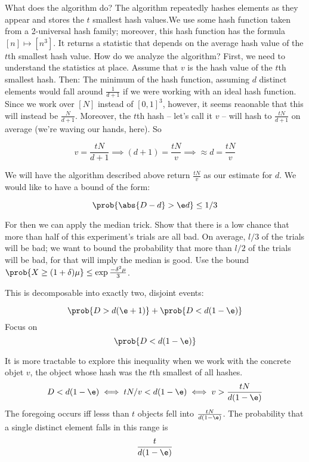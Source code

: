 \documentclass[../main.tex]{subfiles}
\begin{document}
\begin{outline}
    \1 What does the algorithm do?
    \2 The algorithm repeatedly hashes elements as they appear and stores the $t$ smallest hash values.We use some hash function taken from a 2-universal hash family; moreover, this hash function has the formula $[n] \mapsto [n^3]$. It returns a statistic that depends on the average hash value of the $t$th smallest hash value.
    \1 How do we analyze the algorithm?
    \2 First, we need to understand the statistics at place. Assume that $v$ is the hash value of the $t$th smallest hash. Then:
    \3 The minimum of the hash function, assuming $d$ distinct elements would fall around $\frac{1}{d+1}$ if we were working with an ideal hash function.
    \3 Since we work over $[N]$ instead of $[0,1]^3$, however, it seems reaonable that this will instead be $\frac{N}{d+1}$. Moreover, the $t$th hash -- let's call it $v$ -- will hash to $\frac{tN}{d+1}$ on average (we're waving our hands, here). So

    \[
        v = \frac{tN}{d+1} \implies (d+1) = \frac{tN}{v} \implies \approx d = \frac{tN}{v}
    \]

    \1 We will have the algorithm described above return $\frac{tN}{v}$ as our estimate for $d$.
    We would like to have a bound of the form:

    \[
        \prob{ \abs{D - d} > \e d} \leq 1/3
    \]

    For then we can apply the median trick.
    \2 Show that there is a low chance that more than half of this experiment's trials are all bad. On average, $l/3$ of the trials will be bad; we want to bound the probability that more than $l/2$ of the trials will be bad, for that will imply the median is good.
    Use the bound $\prob{X \geq (1 + \delta)\mu} \leq \exp{\frac{-\delta^2 \mu}{3}}$.

    \1 This is decomposable into exactly two, disjoint events:

    \[
        \prob{D > d(\e+ 1)} + \prob{D < d(1 - \e)}
    \]
    \1 Focus on 
    \[
        \prob{D < d(1 - \e)}
    \]

    It is more tractable to explore this inequality when we work
    with the concrete objet $v$, the object whose hash was 
    the $t$th smallest of all hashes.
    \[
        D < d(1 - \e) \iff tN/v < d(1 - \e) \iff v > \frac{tN}{d(1 - \e)}
    \]
    \2 The foregoing occurs iff lesss than $t$ objects fell into $\frac{tN}{d(1 - \e)}$.
    \3 The probability that a single distinct element falls in this range is
    \[
        \frac{t}{d(1-\e)}
    \]
    

\end{outline}
\end{document}
